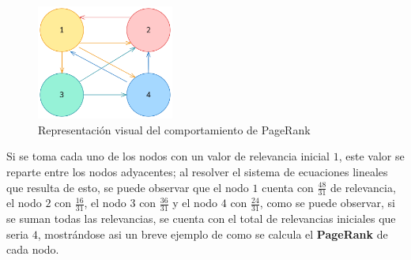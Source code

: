 \begin{figure}[h!]
    \centering
    \includegraphics[width=0.4\textwidth]{src/figures/pageRank.png}
    \caption{Representación visual del comportamiento de PageRank}
    \label{fig:page_rank}
\end{figure}

Si se toma cada uno de los nodos con un valor de relevancia inicial $1$, este valor se reparte entre los nodos adyacentes; al resolver el sistema de ecuaciones lineales que resulta de esto, se puede observar que el nodo $1$ cuenta con $\frac{48}{31}$ de relevancia, el nodo $2$ con $\frac{16}{31}$, el nodo $3$ con $\frac{36}{31}$ y el nodo $4$ con $\frac{24}{31}$, como se puede observar, si se suman todas las relevancias, se cuenta con el total de relevancias iniciales que seria $4$, mostrándose asi un breve ejemplo de como se calcula el \textbf{PageRank} de cada nodo.